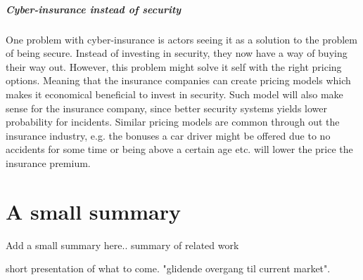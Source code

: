 \subparagraph{Cyber-insurance instead of security}
One problem with cyber-insurance is actors seeing it as a solution to the problem of being secure. Instead of investing in security, they now have a way of buying their way out. 
However, this problem might solve it self with the right pricing options. Meaning that the insurance companies can create pricing models which makes it economical beneficial to invest in security. Such model will also make sense for the insurance company, since better security systems yields lower probability for incidents.
Similar pricing models are common through out the insurance industry, e.g. the bonuses a car driver might be offered due to no accidents for some time or being above a certain age etc. will lower the price the insurance premium.  


\section{A small summary}
Add a small summary here..
summary of related work  

short presentation of what to come. "glidende overgang til current market".






